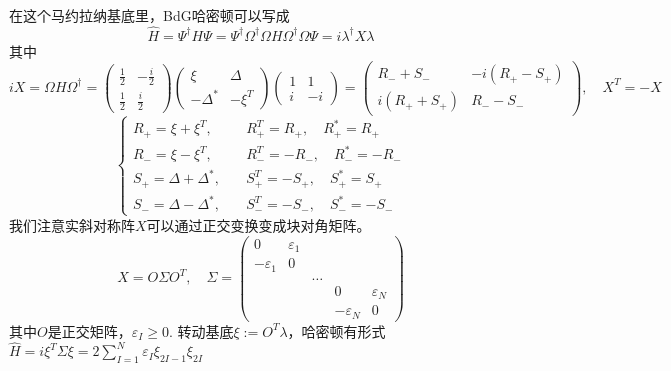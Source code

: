 \documentclass{article}
\numberwithin{equation}{subsection}
\begin{document}
在这个马约拉纳基底里，BdG哈密顿可以写成
\begin{equation}
    \hat{H}=\Psi^\dagger H\Psi=\Psi^\dagger \Omega^\dagger\Omega H\Omega^\dagger \Omega \Psi=i\lambda^\dagger X\lambda
\end{equation}
其中
\begin{equation}
    iX=\Omega H \Omega^\dagger=\begin{pmatrix}
        \frac{1}{2}&-\frac{i}{2}\\
        \frac{1}{2}&\frac{i}{2}
    \end{pmatrix}\begin{pmatrix}
        \xi&\Delta\\
        -\Delta^*&-\xi^T
    \end{pmatrix}\begin{pmatrix}
        1&1\\
        i&-i
    \end{pmatrix}=\begin{pmatrix}
        R_-+S_-&-i(R_+-S_+)\\
        i(R_++S_+)&R_--S_-
    \end{pmatrix},\quad X^T=-X
\end{equation}
\begin{equation}
    \begin{cases}
        R_+=\xi+\xi^T,&\quad R_+^T=R_+,\quad R_+^*=R_+\\
        R_-=\xi-\xi^T,&\quad R_-^T=-R_-,\quad R_-^*=-R_-\\
        S_+=\Delta+\Delta^*,&\quad S_+^T=-S_+,\quad S_+^*=S_+\\
        S_-=\Delta-\Delta^*,&\quad S_-^T=-S_-,\quad S_-^*=-S_-
    \end{cases}
\end{equation}
我们注意实斜对称阵$X$可以通过正交变换变成块对角矩阵。
\begin{equation}
    X=O\Sigma O^T,\quad\Sigma=\begin{pmatrix}
        0&\varepsilon_1\\
        -\varepsilon_1&0\\
        &&\ldots\\
        &&&0&\varepsilon_N\\
        &&&-\varepsilon_N&0
    \end{pmatrix}
\end{equation}
其中$O$是正交矩阵，$\varepsilon_I\geq0$. 转动基底$\xi:=O^T\lambda$，哈密顿有形式$\hat{H}=i\xi^T\Sigma\xi=2\sum_{I=1}^N\varepsilon_I\xi_{2I-1}\xi_{2I}$
\end{document}

